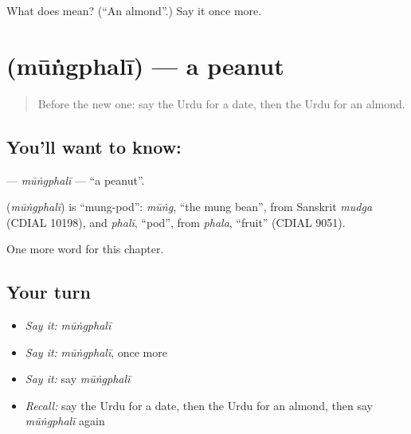 \begin{tcolorbox}[breakable,colback=teal!4,colframe=teal!35!black,title={Before you move on}]
What does  mean? (\textquotedblleft{}An almond\textquotedblright{}.) Say it once more.
\end{tcolorbox}
\section[\texorpdfstring{\ur{مونگ} \ur{پھلی} (mūṅgphalī)}{مونگ پھلی (mūṅgphalī)}]{  (mūṅgphalī) — a peanut}

\label{lesson:UR-C117-mungphali}



\begin{quote}
Before the new one: say the Urdu for a date, then the Urdu for an almond.
\end{quote}

\subsection*{You'll want to know:  }
\textbf{ } — \emph{mūṅgphalī} — \textquotedblleft{}a peanut\textquotedblright{}.

\begin{cousinweb}
\textbf{ } (\emph{mūṅgphalī}) is \textquotedblleft{}mung-pod\textquotedblright{}: \emph{mūṅg}, \textquotedblleft{}the mung bean\textquotedblright{}, from Sanskrit \emph{mudga} (CDIAL 10198), and \emph{phalī}, \textquotedblleft{}pod\textquotedblright{}, from \emph{phala}, \textquotedblleft{}fruit\textquotedblright{} (CDIAL 9051).
\end{cousinweb}

\begin{grammarlens}[title={What you've built}]
One more word for this chapter.
\end{grammarlens}

\subsection*{Your turn}
\begin{itemize}
\raggedright
  \item \emph{Say it:} \emph{mūṅgphalī}
  \item \emph{Say it:} \emph{mūṅgphalī}, once more
  \item \emph{Say it:} say \emph{mūṅgphalī}
  \item \emph{Recall:} say the Urdu for a date, then the Urdu for an almond, then say \emph{mūṅgphalī} again
\end{itemize}

